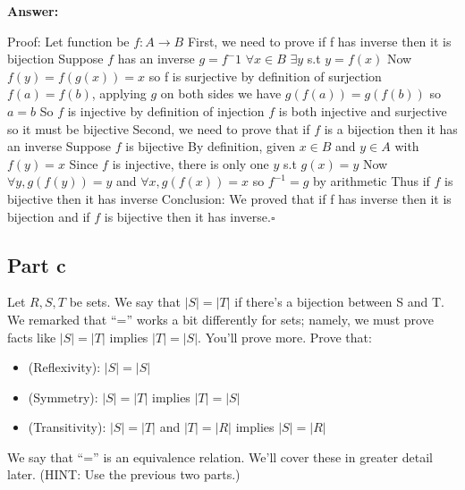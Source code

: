 \documentclass[12pt]{article}
\begin{document}
{\noindent\bf Answer:}
{
 \newline
Proof:
Let function be $f:A \rightarrow B$\newline
First, we need to prove if f has inverse then it is bijection\newline
Suppose $f$ has an inverse $g=f^-1$\newline
$\forall x \in B$ $\exists y$ s.t $y=f(x)$\newline
Now $f(y)=f(g(x))=x$ so f is surjective by definition of surjection\newline
$f(a)=f(b)$, applying $g$ on both sides we have $g(f(a))=g(f(b))$ so $a=b$\newline
So $f$ is injective by definition of injection\newline
$f$ is both injective and surjective so it must be bijective\newline
 \newline
Second, we need to prove that if  $f$ is a bijection then it has an inverse\newline
Suppose $f$ is bijective\newline
By definition, given $x \in B$ and $y \in A$ with $f(y)=x$\newline
Since $f$ is injective, there is only one $y$ s.t $g(x)=y$\newline
Now $\forall y, g(f(y))=y$ and  $\forall x, g(f(x))=x$ so $f^{-1}=g$ by arithmetic\newline
Thus if $f$ is bijective then it has inverse\newline
Conclusion: We proved that  if f has inverse then it is bijection and if $f$ is bijective then it has inverse.$\square$\newline

}
\subsection*{Part c}

Let $R,S,T$ be sets. We say that $\vert S\vert=\vert T\vert$ if there's a bijection between S and T. We remarked that ``='' works a bit differently for sets; namely, we must prove facts like $\vert S\vert=\vert T\vert$ implies $\vert T\vert=\vert S\vert$. You'll prove more. Prove that:
\begin{itemize}
  \item (Reflexivity): $\vert S\vert=\vert S\vert$
    \item (Symmetry): $\vert S\vert=\vert T\vert$ implies $\vert T\vert=\vert S\vert$
      \item (Transitivity): $\vert S\vert=\vert T\vert$ and $\vert T\vert=\vert R\vert$ implies $\vert S\vert=\vert R\vert$
\end{itemize}
We say that ``='' is an equivalence relation. We'll cover these in greater detail later. (HINT: Use the previous two parts.)\\
\end{document}
